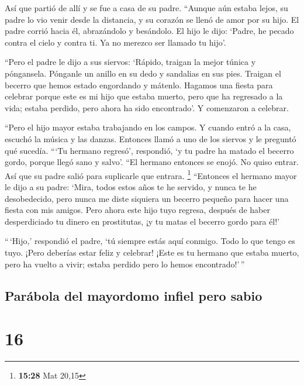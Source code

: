  Así que partió de allí y se fue a casa de su padre.
``Aunque aún estaba lejos, su padre lo vio venir desde la distancia, y
su corazón se llenó de amor por su hijo. El padre corrió hacia él,
abrazándolo y besándolo.  El hijo le dijo: `Padre, he
pecado contra el cielo y contra ti. Ya no merezco ser llamado tu hijo'.

 ``Pero el padre le dijo a sus siervos: `Rápido, traigan
la mejor túnica y póngansela. Pónganle un anillo en su dedo y sandalias
en sus pies.  Traigan el becerro que hemos estado
engordando y mátenlo. Hagamos una fiesta para celebrar 
porque este es mi hijo que estaba muerto, pero que ha regresado a la
vida; estaba perdido, pero ahora ha sido encontrado'. Y comenzaron a
celebrar.

 ``Pero el hijo mayor estaba trabajando en los campos. Y
cuando entró a la casa, escuchó la música y las danzas. 
Entonces llamó a uno de los siervos y le preguntó qué sucedía.
 ```Tu hermano regresó', respondió, `y tu padre ha matado
el becerro gordo, porque llegó sano y salvo'.  ``El
hermano entonces se enojó. No quiso entrar. Así que su padre salió para
suplicarle que entrara. \footnote{\textbf{15:28} Mat 20,15}
 ``Entonces el hermano mayor le dijo a su padre: `Mira,
todos estos años te he servido, y nunca te he desobedecido, pero nunca
me diste siquiera un becerro pequeño para hacer una fiesta con mis
amigos.  Pero ahora este hijo tuyo regresa, después de
haber desperdiciado tu dinero en prostitutas, ¡y tu matas el becerro
gordo para él!'

 ``\,`Hijo,' respondió el padre, `tú siempre estás aquí
conmigo. Todo lo que tengo es tuyo.  ¡Pero deberías estar
feliz y celebrar! ¡Este es tu hermano que estaba muerto, pero ha vuelto
a vivir; estaba perdido pero lo hemos encontrado!'\,''

\hypertarget{paruxe1bola-del-mayordomo-infiel-pero-sabio}{%
\subsection{Parábola del mayordomo infiel pero
sabio}\label{paruxe1bola-del-mayordomo-infiel-pero-sabio}}

\hypertarget{section-15}{%
\section{16}\label{section-15}}

